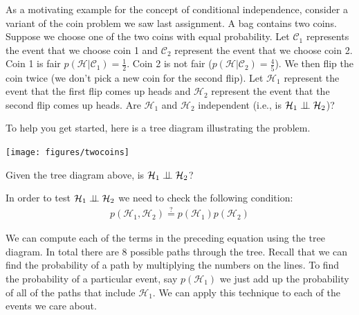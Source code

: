 \documentclass[assignment02_Solutions]{subfiles}
\begin{document}
\begin{exercise}[(20 minutes)]

As a motivating example for the concept of conditional independence, consider a variant of the coin problem we saw last assignment.  A bag contains two coins.  Suppose we choose one of the two coins with equal probability.  Let $\mathcal{C}_1$ represents the event that we choose coin 1 and $\mathcal{C}_2$ represent the event that we choose coin 2.  Coin 1 is fair $p(\mathcal{H} | \mathcal{C}_1) = \frac{1}{2}$.  Coin 2 is not fair ($p(\mathcal{H} | \mathcal{C}_2) = \frac{4}{5}$).   We then flip the coin twice (we don't pick a new coin for the second flip).  Let $\mathcal{H}_1$ represent the event that the first flip comes up heads and $\mathcal{H}_2$ represent the event that the second flip comes up heads.  Are $\mathcal{H}_1$ and $\mathcal{H}_2$ independent (i.e., is $\mathcal{H}_1 \perp\!\!\!\perp \mathcal{H}_2$)?

To help you get started, here is a tree diagram illustrating the problem.

\begin{center}
\texttt{[image: figures/twocoins]}
\end{center}
Given the tree diagram above, is $\mathcal{H}_1 \perp\!\!\!\perp \mathcal{H}_2$?

\begin{boxedsolution}

In order to test $\mathcal{H}_1 \perp\!\!\!\perp \mathcal{H}_2$ we need to check the following condition:
\begin{align}
p(\mathcal{H}_1, \mathcal{H}_2) \stackrel{?}{=} p(\mathcal{H}_1) p(\mathcal{H}_2)
\end{align}

We can compute each of the terms in the preceding equation using the tree diagram.  In total there are 8 possible paths through the tree.  Recall that we can find the probability of a path by multiplying the numbers on the lines.  To find the probability of a particular event, say $p(\mathcal{H}_1)$ we just add up the probability of all of the paths that include $\mathcal{H}_1$.  We can apply this technique to each of the events we care about.


\end{boxedsolution}
\end{exercise}
\end{document}

